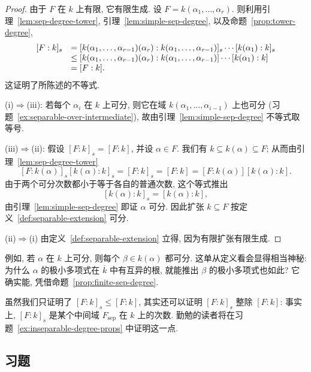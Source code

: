 \begin{proof}
由于 $F$ 在 $k$ 上有限, 它有限生成. 设 $F=k(\alpha_1,\ldots,\alpha_r)$. 则利用引理~\ref{lem:sep-degree-tower}, 引理~\ref{lem:simple-sep-degree}, 以及命题~\ref{prop:tower-degree},
\[
\begin{array}{r l}
[F:k]_s & =[k(\alpha_1,\ldots,\alpha_{r-1})(\alpha_r):k(\alpha_1,\ldots,\alpha_{r-1})]_s\cdots[k(\alpha_1):k]_s \\
& \leq [k(\alpha_1,\ldots,\alpha_{r-1})(\alpha_r):k(\alpha_1,\ldots,\alpha_{r-1})]\cdots[k(\alpha_1):k] \\
& =[F:k].
\end{array}
\]
这证明了所陈述的不等式.

(i)$\Longrightarrow$(iii): 若每个 $\alpha_i$ 在 $k$ 上可分, 则它在域 $k(\alpha_1,\ldots,\alpha_{i-1})$ 上也可分 (习题~\ref{ex:separable-over-intermediate}), 故由引理~\ref{lem:simple-sep-degree} 不等式取等号.

(iii)$\Longrightarrow$(ii): 假设 $[F:k]_s=[F:k]$, 并设 $\alpha\in F$. 我们有 $k\subseteq k(\alpha)\subseteq F$; 从而由引理~\ref{lem:sep-degree-tower}
\[
[F:k(\alpha)]_s[k(\alpha):k]_s=[F:k]_s=[F:k]=[F:k(\alpha)][k(\alpha):k].
\]
由于两个可分次数都小于等于各自的普通次数, 这个等式推出
\[
[k(\alpha):k]_s=[k(\alpha):k],
\]
由引理~\ref{lem:simple-sep-degree} 即证 $\alpha$ 可分. 因此扩张 $k\subseteq F$ 按定义~\ref{def:separable-extension} 可分.

(ii)$\Longrightarrow$(i) 由定义~\ref{def:separable-extension} 立得, 因为有限扩张有限生成.
\end{proof}

例如, 若 $\alpha$ 在 $k$ 上可分, 则每个 $\beta\in k(\alpha)$ 都可分. 这单从定义看会显得相当神秘: 为什么 $\alpha$ 的极小多项式在 $\overline{k}$ 中有互异的根, 就能推出 $\beta$ 的极小多项式也如此? 它确实能, 凭借命题~\ref{prop:finite-sep-degree}.

\begin{remark}\label{rmk:sep-degree-divides}
虽然我们只证明了 $[F:k]_s\leq[F:k]$, 其实还可以证明 $[F:k]_s$ 整除 $[F:k]$: 事实上, $[F:k]_s$ 是某个中间域 $F_{\mathrm{sep}}$ 在 $k$ 上的次数. 勤勉的读者将在习题~\ref{ex:inseparable-degree-props} 中证明这一点.
\end{remark}

\subsection*{习题}
{}


